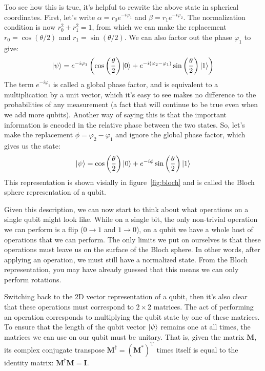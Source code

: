 Too see how this is true, it's helpful to rewrite the above state in spherical coordinates. First, let's
write $\alpha = r_0e^{-i\varphi_1}$ and $\beta = r_1e^{-i\varphi_2}$. The normalization condition is now
$r_0^2 + r_1^2 = 1$, from which we can make the replacement $r_0 = \cos(\theta/2)$ and $r_1 = \sin(\theta/2)$.
We can also factor out the phase $\varphi_1$ to give:
\begin{equation}
\ket{\psi} = e^{-i\varphi_1}\left(
    \cos\left(\frac{\theta}{2}\right)\ket{0} + e^{-i(\varphi_2 - \varphi_1)}\sin\left(\frac{\theta}{2}\right)\ket{1}
  \right)
\end{equation}
The term $e^{-i\varphi_1}$ is called a global phase factor, and is equivalent to a multiplication by a unit vector,
which it's easy to see makes no difference to the probabilities of any measurement (a fact that will continue to be 
true even when we add more qubits). Another way of saying this is that the important information is encoded in 
the relative phase between the two states. So, let's make the replacement $\phi = \varphi_2 - \varphi_1$ and ignore
the global phase factor, which gives us the state:
\begin{equation}
  \ket{\psi} = \cos\left(\frac{\theta}{2}\right)\ket{0} + e^{-i\phi}\sin\left(\frac{\theta}{2}\right)\ket{1}
\end{equation}
This representation is shown visially in figure~\ref{fig:bloch} and is called the Bloch sphere representation
of a qubit.

Given this description, we can now start to think about what operations on a single qubit might look like.
While on a single bit, the only non-trivial operation we can perform is a flip ($0 \rightarrow 1$ and $1 \rightarrow 0$),
on a qubit we have a whole host of operations that we can perform. The only limits we put on ourselves is that these operations
must leave us on the surface of the Bloch sphere. In other words, after applying an operation, we must still
have a normalized state. From the Bloch representation, you may have already guessed that this means we
can only perform rotations.

Switching back to the 2D vector representation of a qubit, then it's also clear that these operations
must correspond to $2\times2$ matrices. The act of performing an operation corresponds to multiplying
the qubit state by one of these matrices. To ensure that the length of the qubit vector $\ket{\psi}$
remains one at all times, the matrices we can use on our qubit must be unitary. That is, given the matrix $\boldsymbol{M}$,
its complex conjugate transpose $\boldsymbol{M}^\dagger = (\boldsymbol{M^{*}})^\mathrm{T}$ times itself is equal to 
the identity matrix: $\boldsymbol{M}^\dagger\boldsymbol{M} = \boldsymbol{I}$.

